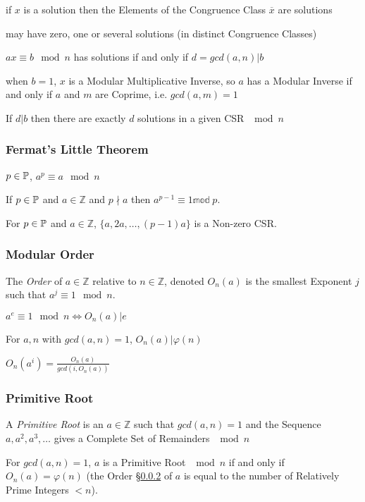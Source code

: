 if $x$ is a solution then the Elements of the Congruence Class $\overline{x}$
are solutions

may have zero, one or several solutions (in distinct Congruence Classes)

$ax \equiv b \mod n$ has solutions if and only if $d = gcd(a,n) | b$

when $b = 1$, $x$ is a Modular Multiplicative Inverse, so $a$ has a Modular
Inverse if and only if $a$ and $m$ are Coprime, i.e. $gcd(a,m) = 1$

If $d|b$ then there are exactly $d$ solutions in a given CSR $\mod n$



\subsubsection{Fermat's Little Theorem}\label{sec:fermat_little}

$p \in \mathbb{P}$, $a^p \equiv a \mod n$

If $p \in \mathbb{P}$ and $a \in \mathbb{Z}$ and $p \nmid a$ then
$a^{p-1} \equiv 1 \mathbb{mod}\;p$.

For $p \in \mathbb{P}$ and $a \in \mathbb{Z}$, $\{ a, 2a, \ldots, (p-1)a
\}$ is a Non-zero CSR.



\subsubsection{Modular Order}\label{sec:modular_order}

The \emph{Order} of $a \in \mathbb{Z}$ relative to $n \in \mathbb{Z}$,
denoted $O_n(a)$ is the smallest Exponent $j$ such that $a^j \equiv 1
\mod n$.

$a^e \equiv 1 \mod n \Leftrightarrow O_n(a) | e$

For $a, n$ with $gcd(a,n) = 1$, $O_n(a) | \varphi(n)$

$O_n(a^i) = \frac{O_n(a)}{gcd(i,O_n(a))}$



\subsubsection{Primitive Root}\label{sec:primitive_root}

A \emph{Primitive Root} is an $a \in \mathbb{Z}$ such that $gcd(a,n) =
1$ and the Sequence $a, a^2, a^3, \ldots$ gives a Complete Set of
Remainders $\mod n$

For $gcd(a,n) = 1$, $a$ is a Primitive Root $\mod n$ if and only if
$O_n(a) = \varphi(n)$ (the Order \S\ref{sec:modular_order} of $a$ is
equal to the number of Relatively Prime Integers $< n$).

